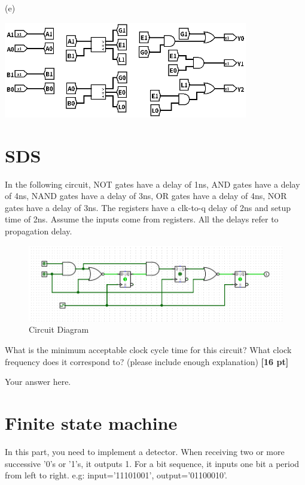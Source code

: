 \documentclass[a4paper]{article}
\begin{document}
\begin{answer}[Question 1]
    \newpage

    (e)\\
    \begin{center}
    \includegraphics[width=0.8\textwidth]{Q1_d.png}
    \end{center}

\end{answer}

\newpage
\section{SDS}
 In the following circuit, NOT gates have a delay of 1ns, AND gates have a delay of 4ns, NAND gates have a delay of 3ns, OR gates have a delay of 4ns, NOR gates have a delay of 3ns. The registers have a clk-to-q delay of 2ns and setup time of 2ns. Assume the inputs
 come from registers. All the delays refer to propagation delay.\\
 
\begin{figure}[hp]
    \centering
    \includegraphics[width=1.0\textwidth]{Q2.png}
    \caption{Circuit Diagram}
    \label{fig:q2}
\end{figure}

What is the minimum acceptable clock cycle time for this circuit? What
 clock frequency does it correspond to? (please include enough explanation) \textbf{[16 pt]}
 
\begin{answer}[Question 2]
        Your answer here. \\
\end{answer}

\newpage
\section{Finite state machine}
In this part, you need to implement a detector. When receiving two or more successive '0's or '1's, it outputs 1. For a bit sequence, it inputs one bit a period from left to right. e.g: input='11101001', output='01100010'.
\end{document}
